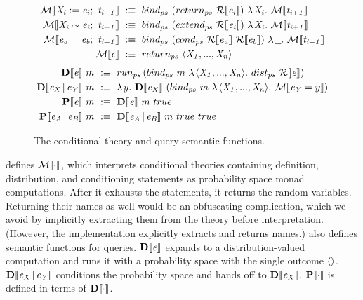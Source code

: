\begin{figure}[tb]
\centering
\begin{equation*}
\begin{split}
	\PS{\mathit{X_i := e_i;\ t_{i+1}}}
		&\ :\equiv\ \appp \bind {\papp \ret {\RV{\mathit{e_i}}}} {\fun {\mathit{X_i}} {\PS{\mathit{t_{i+1}}}}} \\
	\PS{\mathit{X_i \sim e_i;\ t_{i+1}}}
		&\ :\equiv\ \appp \bind {\papp \extendps {\RV{\mathit{e_i}}}} {\fun {\mathit{X_i}} {\PS{\mathit{t_{i+1}}}}} \\
	\PS{\mathit{e_a = e_b;\ t_{i+1}}}
		&\ :\equiv\ \appp \bind {\pappp \condps {\RV{\mathit{e_a}}} {\RV{\mathit{e_b}}}} {\fun \uscore {\PS{\mathit{t_{i+1}}}}} \\
	\PS{\epsilon}
		&\ :\equiv\ \ret~\mathit{\seq{X_1, \dots, X_n}}
\end{split}
\end{equation*}
\begin{equation*}
\begin{split}
	\app {\Dist{\mathit{e}}} m
		&\ :\equiv\ \runps \pappp \bind m {\fun {\mathit{\seq{X_1,\dots,X_n}}} {\app \distps {\RV{\mathit{e}}}}}
\\
	\app {\Dist{\mathit{e_X \given e_Y}}} m
		&\ :\equiv\ \fun y {\app {\Dist{\mathit{e_X}}} {\pappp \bind m {\fun {\mathit{\seq{X_1,\dots,X_n}}} {\PS{\mathit{e_Y} = y}}}}}
\\
	\app {\Prob{\mathit{e}}} m
		&\ :\equiv\ \appp {\Dist{\mathit{e}}} m {true}
\\
	\app {\Prob{\mathit{e_A \given e_B}}} m
		&\ :\equiv\ \apppp {\Dist{\mathit{e_A \given e_B}}} m {true} {true} \\
\end{split}
\end{equation*}
\hrulefill
\caption[Theory extension and query semantic functions]{The conditional theory and query semantic functions.}
\label{fig:ps}
\end{figure}

 defines $\mathcal{M}\!\left\llbracket{\cdot}\right\rrbracket$, which interprets conditional theories containing definition, distribution, and conditioning statements as probability space monad computations. After it exhausts the statements, it returns the random variables. Returning their names as well would be an obfuscating complication, which we avoid by implicitly extracting them from the theory before interpretation. (However, the implementation explicitly extracts and returns names.)
 also defines semantic functions for queries.
$\mathbf{D}\!\left\llbracket{\mathit{e}}\right\rrbracket$ expands to a distribution-valued computation and runs it with a probability space with the single outcome $\langle{}\rangle$. $\mathbf{D}\!\left\llbracket{\mathit{e_X} \,|\,\mathit{e_Y}}\right\rrbracket$ conditions the probability space and hands off to $\mathbf{D}\!\left\llbracket{\mathit{e_X}}\right\rrbracket$. $\mathbf{P}\!\left\llbracket{\cdot}\right\rrbracket$ is defined in terms of $\mathbf{D}\!\left\llbracket{\cdot}\right\rrbracket$.

